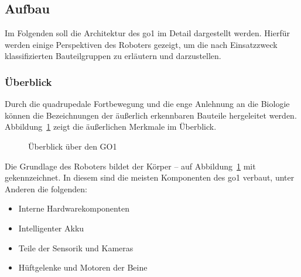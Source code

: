 \subsection{Aufbau}
\label{subsec:aufbau}

Im Folgenden soll die Architektur des \gls{go1} im Detail dargestellt werden.
Hierfür werden einige Perspektiven des Roboters gezeigt, um die nach Einsatzzweck klassifizierten Bauteilgruppen zu erläutern und darzustellen.

\subsubsection{Überblick}

Durch die quadrupedale Fortbewegung und die enge Anlehnung an die Biologie können die Bezeichnungen der äußerlich
erkennbaren Bauteile hergeleitet werden.
Abbildung~\ref{fig:allgemeine_architektur} zeigt die äußerlichen Merkmale im Überblick.

\begin{figure}[h]
    \caption{Überblick über den GO1}\label{fig:allgemeine_architektur}
\end{figure}

Die Grundlage des Roboters bildet der Körper -- auf Abbildung~\ref{fig:allgemeine_architektur} mit  gekennzeichnet.
In diesem sind die meisten Komponenten des \gls{go1} verbaut, unter Anderen die folgenden:

\begin{itemize}
    \item Interne Hardwarekomponenten
    \item Intelligenter Akku
    \item Teile der Sensorik und Kameras
    \item Hüftgelenke und Motoren der Beine
\end{itemize}

